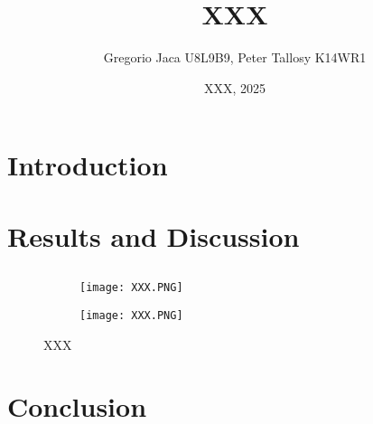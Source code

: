 \documentclass[12pt,a4paper]{article}
\title{XXX}
\author{Gregorio Jaca U8L9B9, Peter Tallosy K14WR1 }
\date{XXX, 2025}
\begin{document}
\maketitle

\begin{abstract}

\end{abstract}

\section{Introduction}

\section{Results and Discussion}

\subsection{}

\begin{figure}[H]
    \centering
    \begin{subfigure}{\linewidth}
        \centering
        \texttt{[image: XXX.PNG]}
    \end{subfigure}
    
    \vspace{1em} %

    \begin{subfigure}{\linewidth}
        \centering
        \texttt{[image: XXX.PNG]}
    \end{subfigure}
    
    \caption{XXX}
    \label{fig:XXX}
\end{figure}

\section{Conclusion}
\end{document}
